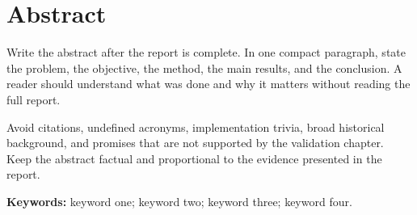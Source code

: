 \chapter*{Abstract}

Write the abstract after the report is complete. In one compact paragraph, state the problem, the objective, the method, the main results, and the conclusion. A reader should understand what was done and why it matters without reading the full report.

Avoid citations, undefined acronyms, implementation trivia, broad historical background, and promises that are not supported by the validation chapter. \\
Keep the abstract factual and proportional to the evidence presented in the report.

\textbf{Keywords:} keyword one; keyword two; keyword three; keyword four.

\clearpage